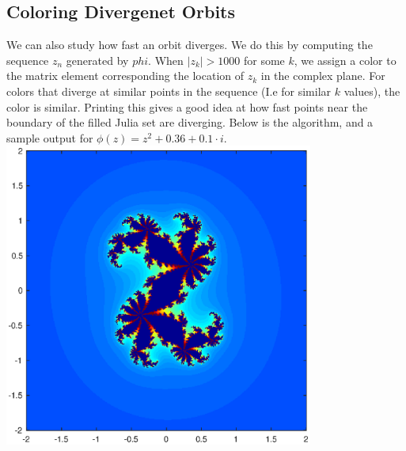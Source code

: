 \documentclass[12pt]{article}
\begin{document}
\subsection{Coloring Divergenet Orbits}
We can also study how fast an orbit diverges. We do this by computing the sequence $z_n$ generated by $phi$. When $|z_k|>1000$ for some $k$, we assign a color to the matrix element corresponding the location of $z_k$ in the complex plane. For colors that diverge at similar points in the sequence (I.e for similar $k$ values), the color is similar. Printing this gives a good idea at how fast points near the boundary of the filled Julia set are diverging. Below is the algorithm, and a sample output for $\phi(z)=z^2+0.36+0.1\cdot i$.\\ 
   \newline
   \includegraphics [width=4in]{ColorOrbit_01.eps}
   
\end{document}
